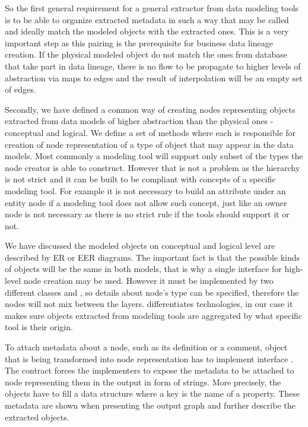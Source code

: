 So the first general requirement for a general extractor from data modeling tools is to be able to organize extracted metadata in such a way that  may be called and ideally match the modeled objects with the extracted ones.
This is a very important step as this pairing is the prerequisite for business data lineage creation. If the physical modeled object do not match the ones from database that take part in data lineage, there is no flow to be propagate to higher levels of abstraction via maps to edges and the result of interpolation will be an empty set of edges.

Secondly, we have defined a common way of creating nodes representing objects extracted from data models of higher abstraction than the physical ones - conceptual and logical.
We define a set of methods where each is responsible for creation of node representation of a type of object that may appear in the data models. Most commonly a modeling tool will support only subset of the types the node creator is able to construct. However that is not a problem as the hierarchy is not strict and it can be built to be compliant with concepts of a specific modeling tool. 
For example it is not necessary to build an attribute under an entity node if a modeling tool does not allow such concept, just like an owner node is not necessary as there is no strict rule if the tools should support it or not.

We have discussed the modeled objects on conceptual and logical level are described by ER or EER diagrams. 
The important fact is that the possible kinds of objects will be the same in both models, that is why a single interface  for high-level node creation may be used.
However it must be implemented by two different classes  and , so details about node's type can be specified, therefore the nodes will not mix between the layers.
 differentiates technologies, in our case it makes sure objects extracted from modeling tools are aggregated by what specific tool is their origin.

To attach metadata about a node, such as its definition or a comment, object that is being transformed into node representation has to implement interface .
The contract forces the implementers to expose the metadata to be attached to node representing them in the output in form of strings. 
More precisely, the objects have to fill a  data structure where a key is the name of a property. 
These metadata are shown when presenting the output graph and further describe the extracted objects.


